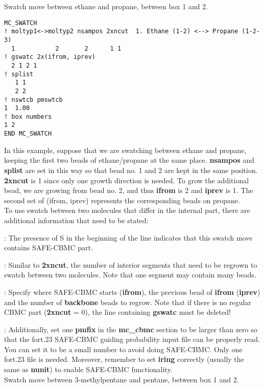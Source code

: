 \documentclass[12pt,letterpaper]{article}
\begin{document}
\hfill\break
Swatch move between ethane and propane, between box 1 and 2.

\begin{verbatim}
MC_SWATCH
! moltyp1<->moltyp2 nsampos 2xncut  1. Ethane (1-2) <--> Propane (1-2-3)
  1           2       2      1 1
! gswatc 2x(ifrom, iprev)
  2 1 2 1
! splist
   1 1
   2 2
! nswtcb pmswtcb
1  1.00
! box numbers
1 2
END MC_SWATCH
\end{verbatim}

\noindent In this example, suppose that we are swatching between ethane and propane, keeping the first two beads of ethane/propane at the same place. {\bf nsampos} and {\bf splist} are set in this way so that bead no. 1 and 2 are kept in the same position. {\bf 2xncut} is 1 since only one growth direction is needed. To grow the additional bead, we are growing from bead no. 2, and thus {\bf ifrom} is 2 and {\bf iprev} is 1. The second set of (ifrom, iprev) represents the corresponding beads on propane. \\

\noindent To use swatch between two molecules that differ in the internal part, there are additional information that need to be stated:

: The presence of S in the beginning of the line indicates that this swatch move contains SAFE-CBMC part.

: Similar to {\bf 2xncut}, the number of interior segments that need to be regrown to swatch between two molecules. Note that one segment may contain many beads.

: Specify where SAFE-CBMC starts ({\bf ifrom}), the previous bead of {\bf ifrom} ({\bf iprev}) and the number of {\bf backbone} beads to regrow. Note that if there is no regular CBMC part ({\bf 2xncut} = 0), the line containing {\bf gswatc} must be deleted!  

: Additionally, set one {\bf pmfix} in the {\bf mc\_cbmc} section to be larger than zero so that the fort.23 SAFE-CBMC guiding probability input file can be properly read. You can set it to be a small number to avoid doing SAFE-CBMC. Only one fort.23 file is needed. Moreover, remember to set {\bf iring} correctly (usually the same as {\bf nunit}) to enable SAFE-CBMC functionality. \\

\hfill\break
Swatch move between 3-methylpentane and pentane, between box 1 and 2.
\end{document}
